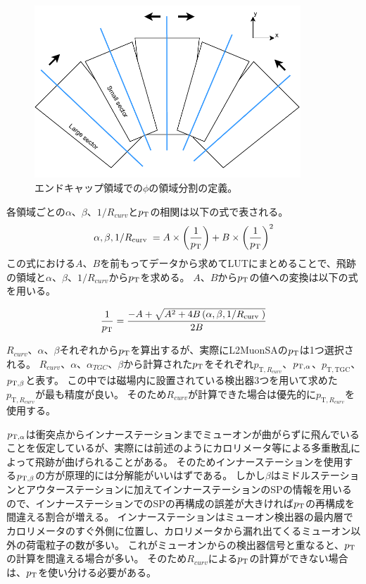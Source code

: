 \begin{figure}[h]
  \centering
  \includegraphics[clip, width=10cm]{fig/3/LUT_binning.pdf}
  \caption{エンドキャップ領域での$\phi$の領域分割の定義。}
  \label{fig:3-10}
\end{figure}

各領域ごとの$\alpha$、$\beta$、$1/R_{curv}$と$p_\mathrm{T}$の相関は以下の式で表される。
\begin{equation}
    \alpha, \beta, 1 / R_{\text {curv }}=A \times\left(\frac{1}{p_\mathrm{T}}\right)+B \times\left(\frac{1}{p_\mathrm{T}}\right)^2
\end{equation}
この式における$A$、$B$を前もってデータから求めてLUTにまとめることで、飛跡の領域と$\alpha$、$\beta$、$1/R_{curv}$から$p_\mathrm{T}$を求める。
$A$、$B$から$p_\mathrm{T}$の値への変換は以下の式を用いる。

\begin{equation}
    \frac{1}{p_\mathrm{T}}=\frac{-A+\sqrt{A^2+4 B\left(\alpha, \beta, 1 / R_{\text {curv }}\right)}}{2 B}
\end{equation}

$R_{curv}$、$\alpha$、$\beta$それぞれから$p_\mathrm{T}$を算出するが、実際にL2MuonSAの$p_\mathrm{T}$は1つ選択される。
$R_{curv}$、$\alpha$、$\alpha_{TGC}$、$\beta$から計算された$p_\mathrm{T}$をそれぞれ$p_{\mathrm{T},R_{curv}}$、$p_{\mathrm{T}, \alpha}$、$p_{\mathrm{T,TGC}}$、$p_{\mathrm{T}, \beta}$と表す。
この中では磁場内に設置されている検出器3つを用いて求めた$p_{\mathrm{T},R_{curv}}$が最も精度が良い。
そのため$R_{curv}$が計算できた場合は優先的に$p_{\mathrm{T},R_{curv}}$を使用する。

$p_{\mathrm{T}, \alpha}$は衝突点からインナーステーションまでミューオンが曲がらずに飛んでいることを仮定しているが、実際には前述のようにカロリメータ等による多重散乱によって飛跡が曲げられることがある。
そのためインナーステーションを使用する$p_{\mathrm{T}, \beta}$の方が原理的には分解能がいいはずである。
しかし$\beta$はミドルステーションとアウターステーションに加えてインナーステーションのSPの情報を用いるので、インナーステーションでのSPの再構成の誤差が大きければ$p_\mathrm{T}$の再構成を間違える割合が増える。
インナーステーションはミューオン検出器の最内層でカロリメータのすぐ外側に位置し、カロリメータから漏れ出てくるミューオン以外の荷電粒子の数が多い。
これがミューオンからの検出器信号と重なると、$p_\mathrm{T}$の計算を間違える場合が多い。
そのため$R_{curv}$による$p_\mathrm{T}$の計算ができない場合は、$p_\mathrm{T}$を使い分ける必要がある。


